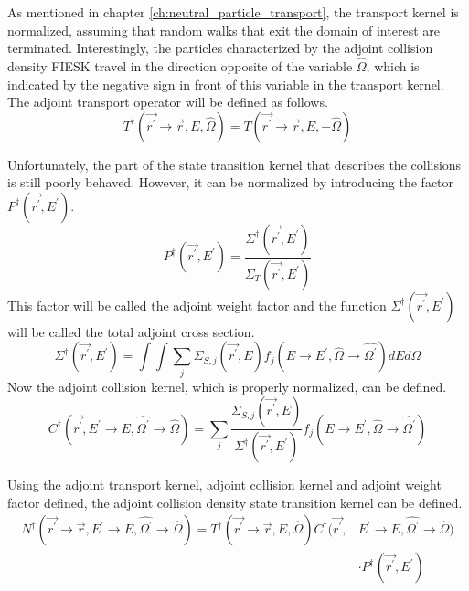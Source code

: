 As mentioned in chapter \ref{ch:neutral_particle_transport}, the transport 
kernel is normalized, assuming that random walks that exit the domain of 
interest are terminated. Interestingly, the particles characterized by the 
adjoint collision density FIESK travel in the direction opposite of the 
variable $\hat{\Omega}$, which is indicated by the negative sign in front of
this variable in the transport kernel. The adjoint transport operator will be
defined as follows.
\begin{equation}
  T^{\dagger}(\vec{r^{'}} \to \vec{r},E,\hat{\Omega}) = 
  T(\vec{r^{'}} \to \vec{r},E,-\hat{\Omega})
  \label{eq:adjoint_transport_kernel}
\end{equation}

Unfortunately, the part of the state transition kernel that describes the 
collisions is still poorly behaved. However, it can be normalized by 
introducing the factor $P^{\dagger}(\vec{r^{'}},E^{'})$.
\begin{equation}
  P^{\dagger}(\vec{r^{'}},E^{'}) = 
  \frac{\Sigma^{\dagger}(\vec{r^{'}},E^{'})}{\Sigma_T(\vec{r^{'}},E^{'})}
  \label{eq:adjoint_weight_factor}
\end{equation}
This factor will be called the adjoint weight factor and the function 
$\Sigma^{\dagger}(\vec{r^{'}},E^{'})$ will be called the total adjoint cross 
section.
\begin{equation}
  \Sigma^{\dagger}(\vec{r^{'}},E^{'}) = \int\int \sum_j \Sigma_{S,j}(\vec{r^{'}},E) 
      f_j(E \to E^{'}, \hat{\Omega} \to \hat{\Omega^{'}}) dE d\Omega
  \label{eq:adjoint_total_cross_section}
\end{equation}
Now the adjoint collision kernel, which is properly normalized, can be 
defined.
\begin{equation}
  C^{\dagger}(\vec{r^{'}},E^{'} \to E,\hat{\Omega^{'}} \to \hat{\Omega}) = 
  \sum_j \frac{\Sigma_{S,j}(\vec{r^{'}},E)}{\Sigma^{\dagger}(\vec{r^{'}},E^{'})}
  f_j(E \to E^{'},\hat{\Omega} \to \hat{\Omega^{'}})
  \label{eq:adjoint_collision_kernel}
\end{equation}

Using the adjoint transport kernel, adjoint collision kernel and adjoint
weight factor defined, the adjoint collision density state transition kernel
can be defined.
\begin{equation}
  \begin{split}
    N^{\dagger}(\vec{r^{'}} \to \vec{r},E^{'} \to E,\hat{\Omega^{'}} \to \hat{\Omega})
    = T^{\dagger}(\vec{r^{'}} \to \vec{r},E,\hat{\Omega})
    C^{\dagger}(\vec{r^{'}},&E^{'} \to E,\hat{\Omega^{'}} \to \hat{\Omega}) \\
    & \cdot P^{\dagger}(\vec{r^{'}},E^{'})
  \end{split}
\end{equation}

